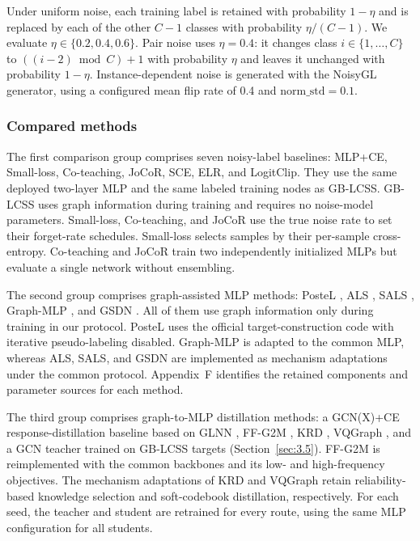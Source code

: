 \documentclass[times,review,10pt]{elsarticle}
\theoremstyle{definition}
\theoremstyle{plain}
\begin{document}
Under uniform noise, each training label is retained with probability \(1-\eta\) and is replaced by each of the other \(C-1\) classes with probability \(\eta/(C-1)\). We evaluate \(\eta\in\{0.2,0.4,0.6\}\). Pair noise uses \(\eta=0.4\): it changes class \(i\in\{1,\ldots,C\}\) to \(((i-2)\bmod C)+1\) with probability \(\eta\) and leaves it unchanged with probability \(1-\eta\). Instance-dependent noise is generated with the NoisyGL generator, using a configured mean flip rate of 0.4 and \(\text{norm\_std}=0.1\).

\subsubsection{Compared methods}\label{sec:4.1.3}

The first comparison group comprises seven noisy-label baselines: MLP+CE, Small-loss, Co-teaching, JoCoR, SCE, ELR, and LogitClip. They use the same deployed two-layer MLP and the same labeled training nodes as GB-LCSS. GB-LCSS uses graph information during training and requires no noise-model parameters. Small-loss, Co-teaching, and JoCoR use the true noise rate to set their forget-rate schedules. Small-loss selects samples by their per-sample cross-entropy. Co-teaching and JoCoR train two independently initialized MLPs but evaluate a single network without ensembling.

The second group comprises graph-assisted MLP methods: PosteL \cite{ref54}, ALS \cite{ref55}, SALS \cite{ref56}, Graph-MLP \cite{ref3}, and GSDN \cite{ref40}. All of them use graph information only during training in our protocol. PosteL uses the official target-construction code with iterative pseudo-labeling disabled. Graph-MLP is adapted to the common MLP, whereas ALS, SALS, and GSDN are implemented as mechanism adaptations under the common protocol. Appendix~F identifies the retained components and parameter sources for each method.

The third group comprises graph-to-MLP distillation methods: a GCN(X)+CE response-distillation baseline based on GLNN \cite{ref4}, FF-G2M \cite{ref45}, KRD \cite{ref46}, VQGraph \cite{ref47}, and a GCN teacher trained on GB-LCSS targets (Section~\ref{sec:3.5}). FF-G2M is reimplemented with the common backbones and its low- and high-frequency objectives. The mechanism adaptations of KRD and VQGraph retain reliability-based knowledge selection and soft-codebook distillation, respectively. For each seed, the teacher and student are retrained for every route, using the same MLP configuration for all students.
\end{document}
